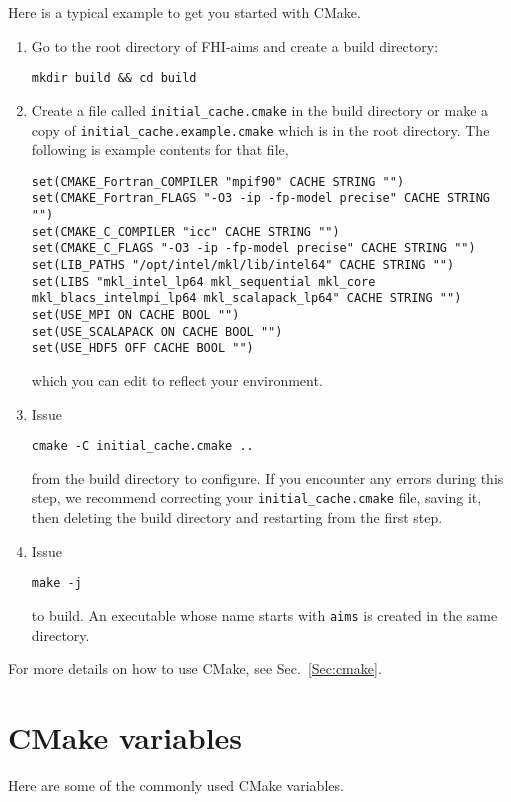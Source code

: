 Here is a typical example to get you started with CMake.
\begin{enumerate}
\item Go to the root directory of FHI-aims and create a build directory:
\begin{verbatim}
mkdir build && cd build
\end{verbatim}
\item Create a file called \texttt{initial\_cache.cmake} in the build directory or make a copy of \texttt{initial\_cache.example.cmake} which is in the root directory. The following is example contents for that file,
\begin{verbatim}
set(CMAKE_Fortran_COMPILER "mpif90" CACHE STRING "")
set(CMAKE_Fortran_FLAGS "-O3 -ip -fp-model precise" CACHE STRING "")
set(CMAKE_C_COMPILER "icc" CACHE STRING "")
set(CMAKE_C_FLAGS "-O3 -ip -fp-model precise" CACHE STRING "")
set(LIB_PATHS "/opt/intel/mkl/lib/intel64" CACHE STRING "")
set(LIBS "mkl_intel_lp64 mkl_sequential mkl_core
mkl_blacs_intelmpi_lp64 mkl_scalapack_lp64" CACHE STRING "")
set(USE_MPI ON CACHE BOOL "")
set(USE_SCALAPACK ON CACHE BOOL "")
set(USE_HDF5 OFF CACHE BOOL "")
\end{verbatim}
  which you can edit to reflect your environment.
\item Issue
\begin{verbatim}
cmake -C initial_cache.cmake ..
\end{verbatim}
  from the build directory to configure.  If you encounter any errors during this step, we recommend correcting your \texttt{initial\_cache.cmake} file, saving it, then deleting the build directory and restarting from the first step.
\item Issue
\begin{verbatim}
make -j
\end{verbatim}
to build. An executable whose name starts with \texttt{aims} is created in the same directory.
\end{enumerate}
For more details on how to use CMake, see Sec.~\ref{Sec:cmake}.

\section{CMake variables}
\label{Sec:cmake-variables}

Here are some of the commonly used CMake variables.

